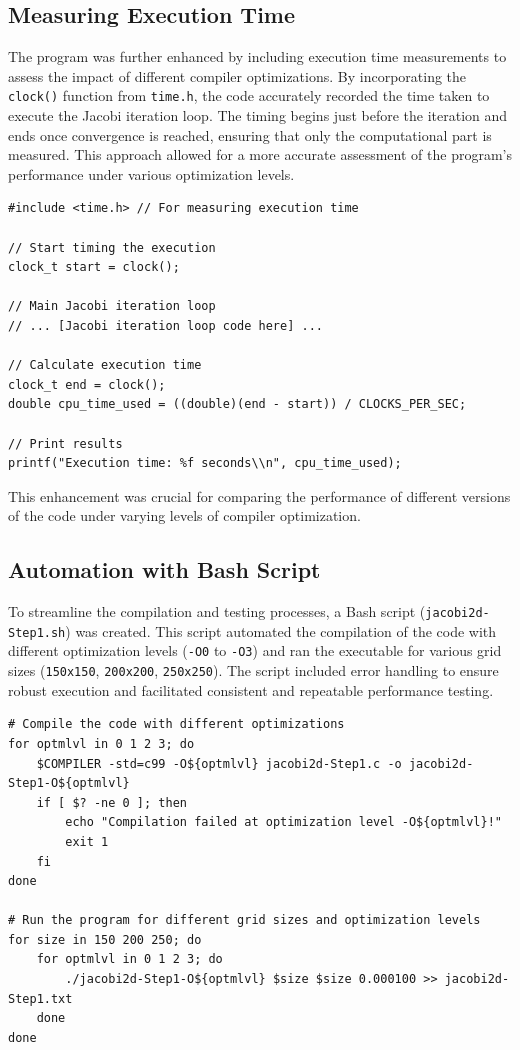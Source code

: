 \documentclass{article}
\begin{document}
\subsection{Measuring Execution Time}

The program was further enhanced by including execution time measurements to assess the impact of different compiler optimizations. By incorporating the \texttt{clock()} function from \texttt{time.h}, the code accurately recorded the time taken to execute the Jacobi iteration loop. The timing begins just before the iteration and ends once convergence is reached, ensuring that only the computational part is measured. This approach allowed for a more accurate assessment of the program's performance under various optimization levels.

\begin{lstlisting}[style=CStyle, caption={Execution Time Measurement}]
#include <time.h> // For measuring execution time

// Start timing the execution
clock_t start = clock();

// Main Jacobi iteration loop
// ... [Jacobi iteration loop code here] ...

// Calculate execution time
clock_t end = clock();
double cpu_time_used = ((double)(end - start)) / CLOCKS_PER_SEC;

// Print results
printf("Execution time: %f seconds\\n", cpu_time_used);
\end{lstlisting}

This enhancement was crucial for comparing the performance of different versions of the code under varying levels of compiler optimization.

\subsection{Automation with Bash Script}

To streamline the compilation and testing processes, a Bash script (\texttt{jacobi2d-Step1.sh}) was created. This script automated the compilation of the code with different optimization levels (\texttt{-O0} to \texttt{-O3}) and ran the executable for various grid sizes (\texttt{150x150}, \texttt{200x200}, \texttt{250x250}). The script included error handling to ensure robust execution and facilitated consistent and repeatable performance testing.

\begin{lstlisting}[style=BashStyle, caption={Bash Script for Compilation and Execution}]
# Compile the code with different optimizations
for optmlvl in 0 1 2 3; do
    $COMPILER -std=c99 -O${optmlvl} jacobi2d-Step1.c -o jacobi2d-Step1-O${optmlvl}
    if [ $? -ne 0 ]; then
        echo "Compilation failed at optimization level -O${optmlvl}!"
        exit 1
    fi
done

# Run the program for different grid sizes and optimization levels
for size in 150 200 250; do
    for optmlvl in 0 1 2 3; do
        ./jacobi2d-Step1-O${optmlvl} $size $size 0.000100 >> jacobi2d-Step1.txt
    done
done
\end{lstlisting}
\end{document}
